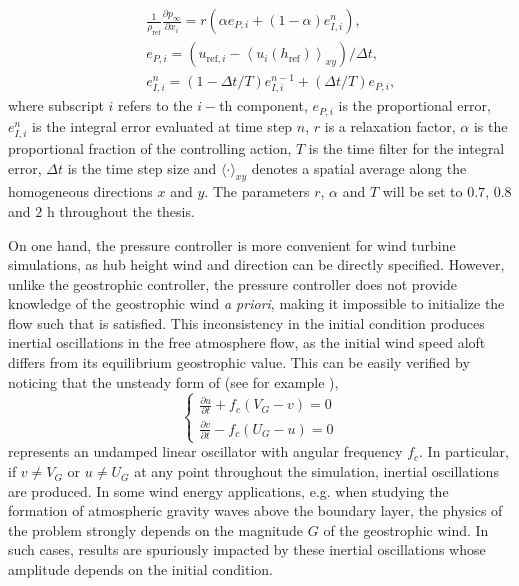 \begin{eqnarray}
	&&\frac{1}{\rho_\text{ref}}\frac{\partial p_\infty}{\partial x_i} = r\left(\alpha  e_{P,i} + (1-\alpha) e^n_{I,i}\right), \label{eq:pControl_1}\\
	&& e_{P,i} =\left(u_{\text{ref},i} - \left\langle u_i(h_\text{ref})\right\rangle_{xy}\right)\big/\Delta t, \label{eq:pControl_2} \\
	&& e^n_{I,i} = (1 - \Delta t / T) e^{n-1}_{I,i} + (\Delta t / T) e_{P,i}, \label{eq:pControl_3}
\end{eqnarray}
where subscript $i$ refers to the $i-$th component, $e_{P,i}$ is the proportional error, $e^n_{I,i}$ is the integral error evaluated at time step $n$, $r$ is a relaxation factor, $\alpha$ is the proportional fraction of the controlling action, $T$ is the time filter for the integral error, $\Delta t$ is the time step size and $\langle\cdot\rangle_{xy}$ denotes a spatial average along the homogeneous directions $x$ and $y$. The parameters $r$, $\alpha$ and $T$ will be set to $0.7$, $0.8$ and $2$ h throughout the thesis. 

On one hand, the pressure controller is more convenient for wind turbine simulations, as hub height wind and direction can be directly specified. However, unlike the geostrophic controller, the pressure controller does not provide knowledge of the geostrophic wind \textit{a priori}, making it impossible to initialize the flow such that  is satisfied. This inconsistency in the initial condition produces inertial oscillations in the free atmosphere flow, as the initial wind speed aloft differs from its equilibrium geostrophic value. This can be easily verified by noticing that the unsteady form of  (see for example \citealp{Stull1988}),
\begin{equation}
	\begin{cases}
		\frac{\partial u}{\partial t} + f_c(V_G - v) = 0  \\
		\frac{\partial v}{\partial t} - f_c(U_G -u) = 0
	\end{cases} 
	\label{eq:geoBalanceUnsteady}
\end{equation}
represents an undamped linear oscillator with angular frequency $f_c$. In particular, if $v\neq V_G$ or $u\neq U_G$ at any point throughout the simulation, inertial oscillations are produced. In some wind energy applications, e.g. when studying the formation of atmospheric gravity waves above the boundary layer, the physics of the problem strongly depends on the magnitude $G$ of the geostrophic wind. In such cases, results are spuriously impacted by these inertial oscillations whose amplitude depends on the initial condition.

